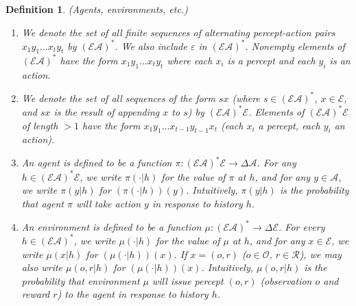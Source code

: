 \documentclass[twoside]{article}
\newtheorem{definition}[theorem]{Definition}
\begin{document}
\begin{definition}
\label{omnibusdefn}
    (Agents, environments, etc.)
    \begin{enumerate}
        \item
        We denote the set of all finite sequences
        of alternating percept-action pairs $x_1y_1\ldots x_ty_t$
        by $(\mathcal E\mathcal A)^*$.
        We also include $\varepsilon$ in $(\mathcal E\mathcal A)^*$.
        Nonempty elements of $(\mathcal E\mathcal A)^*$ have the
        form $x_1y_1\ldots x_ty_t$ where each $x_i$ is a percept and
        each $y_i$ is an action.
        \item
        We denote the set of all sequences of the form $sx$ (where
        $s\in (\mathcal E\mathcal A)^*$, $x\in\mathcal E$, and $sx$
        is the result of appending $x$ to $s$) by
        $(\mathcal E\mathcal A)^*\mathcal E$.
        Elements of $(\mathcal E\mathcal A)^* \mathcal E$
        of length $>1$ have the form
        $x_1y_1\ldots x_{t-1}y_{t-1}x_t$
        (each $x_i$ a percept, each $y_i$ an action).
        \item
        An \emph{agent} is defined to be a function
        $\pi:(\mathcal E\mathcal A)^*\mathcal E\to \Delta \mathcal A$.
        For any $h\in (\mathcal E\mathcal A)^*\mathcal E$,
        we write $\pi(\cdot|h)$ for the value of $\pi$ at $h$, and
        for any $y\in \mathcal A$, we write $\pi(y|h)$ for
        $(\pi(\cdot|h))(y)$.
        Intuitively, $\pi(y|h)$ is the probability that agent $\pi$
        will take action $y$ in response to history $h$.
        \item
        An \emph{environment} is defined to be a function
        $\mu:(\mathcal E\mathcal A)^*\to\Delta\mathcal E$.
        For every $h\in(\mathcal E\mathcal A)^*$, we write
        $\mu(\cdot|h)$ for the value of $\mu$ at $h$, and for any
        $x\in\mathcal E$, we write $\mu(x|h)$ for $(\mu(\cdot|h))(x)$.
        If $x=(o,r)$ ($o\in\mathcal O$, $r\in\mathcal R$), we may also
        write $\mu(o,r|h)$ for $(\mu(\cdot|h))(x)$.
        Intuitively, $\mu(o,r|h)$ is the probability that environment
        $\mu$ will issue percept $(o,r)$ (observation $o$ and reward $r$)
        to the agent in response to history $h$.
    \end{enumerate}
\end{definition}
\end{document}
